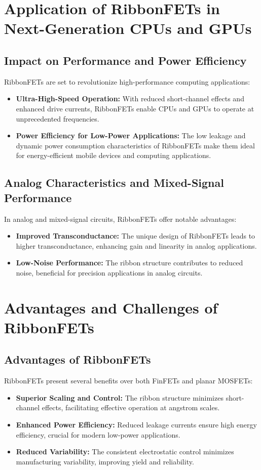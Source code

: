 \documentclass[12pt]{report}
\begin{document}
\begin{titlepage}
\section{Application of RibbonFETs in Next-Generation CPUs and GPUs}
\subsection{Impact on Performance and Power Efficiency}
RibbonFETs are set to revolutionize high-performance computing applications:
\begin{itemize}
    \item \textbf{Ultra-High-Speed Operation:} With reduced short-channel effects and enhanced drive currents, RibbonFETs enable CPUs and GPUs to operate at unprecedented frequencies.
    \item \textbf{Power Efficiency for Low-Power Applications:} The low leakage and dynamic power consumption characteristics of RibbonFETs make them ideal for energy-efficient mobile devices and computing applications.
\end{itemize}

\subsection{Analog Characteristics and Mixed-Signal Performance}
In analog and mixed-signal circuits, RibbonFETs offer notable advantages:
\begin{itemize}
    \item \textbf{Improved Transconductance:} The unique design of RibbonFETs leads to higher transconductance, enhancing gain and linearity in analog applications.
    \item \textbf{Low-Noise Performance:} The ribbon structure contributes to reduced noise, beneficial for precision applications in analog circuits.
\end{itemize}

\section{Advantages and Challenges of RibbonFETs}
\subsection{Advantages of RibbonFETs}
RibbonFETs present several benefits over both FinFETs and planar MOSFETs:
\begin{itemize}
    \item \textbf{Superior Scaling and Control:} The ribbon structure minimizes short-channel effects, facilitating effective operation at angstrom scales.
    \item \textbf{Enhanced Power Efficiency:} Reduced leakage currents ensure high energy efficiency, crucial for modern low-power applications.
    \item \textbf{Reduced Variability:} The consistent electrostatic control minimizes manufacturing variability, improving yield and reliability.
\end{itemize}


\end{titlepage}
\end{document}
